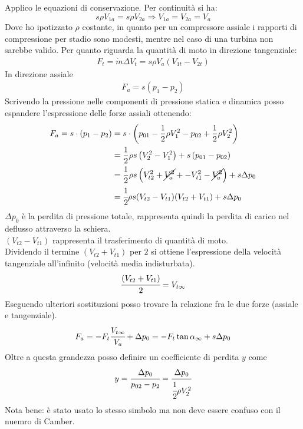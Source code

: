 Applico le equazioni di conservazione. 
Per continuità si ha:
\begin{equation}
s \rho V_{1a} = s \rho V_{2a} \Rightarrow V_{1a} = V_{2a} = V_a
\end{equation}
Dove ho ipotizzato $\rho$ costante, in quanto per un compressore assiale i rapporti di compressione per stadio sono modesti, mentre nel caso di una turbina non sarebbe valido. Per quanto riguarda la quantità di moto in direzione tangenziale:
\begin{align*}
F_t= \dot{m} \Delta V_t = s \rho	V_a (V_{1t}-V_{2t})
\end{align*}
In direzione assiale
\begin{align*}
F_a = s (p_1 - p_2)
\end{align*}
Scrivendo la pressione nelle componenti di pressione statica e dinamica posso espandere l'espressione delle forze assiali ottenendo:
\begin{align*}
F_a = s \cdot ( p_1 - p_2) &= s \cdot \left( p_{01} - \frac{1}{2} \rho V_1^2 - p_{02} + \frac{1}{2} \rho V_2^2 \right)\\
&= \frac{1}{2} \rho s \left( V_2^2 - V_1^2 \right) + s \left( p_{01} - p_{02} \right)\\
&= \frac{1}{2} \rho s \left( V_{t2}^2 + \cancel{V_a^2} + - V_{t1}^2- \cancel{V_a^2} \right) + s \Delta p_0\\
&=\cfrac{1}{2} \rho s (V_{t2}-V_{t1}) (V_{t2}+V_{t1}) + s \Delta p_0
\end{align*}
$\Delta p_0$ è la perdita di pressione totale, rappresenta quindi la perdita di carico nel deflusso attraverso la schiera. \\
$(V_{t2}-V_{t1})$ rappresenta il trasferimento di quantità di moto. \\
Dividendo il termine $(V_{t2}+V_{t1})$ per $2$ si ottiene l'espressione della velocità tangenziale all'infinito (velocità media indisturbata).
\begin{align*}
\cfrac{(V_{t2}+V_{t1})}{2} = V_{t \infty}
\end{align*}
Eseguendo ulteriori sostituzioni posso trovare la relazione fra le due forze (assiale e tangenziale).
\begin{align*}
F_a = -F_t \cfrac{V_{t \infty}}{V_a} + \Delta p_0 = - F_t \tan \alpha_{\infty} + s \Delta p_0
\end{align*}
Oltre a questa grandezza posso definire un coefficiente di perdita $y$ come
\begin{align*}
y = \cfrac{\Delta p_0}{p_{02}-p_2} = \cfrac{\Delta p_0}{\cfrac{1}{2} \rho V_2^2}
\end{align*}
Nota bene: è stato usato lo stesso simbolo ma non deve essere confuso con il nuemro di Camber.

